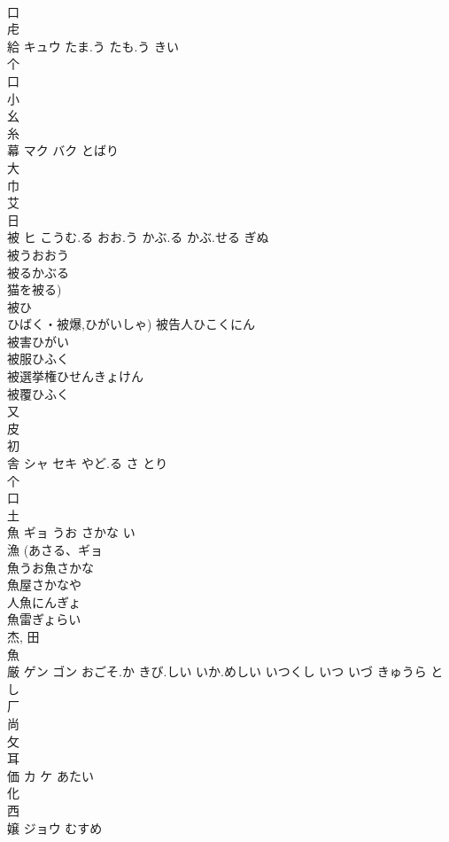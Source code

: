 \documentclass[8pt]{extreport}
\begin{document}
\begin{CJK}{UTF8}{min}
\\	口 
\\	虍 
\\	給	キュウ	たま.う たも.う きい	
\\	个 
\\	口 
\\	小 
\\	幺 
\\	糸 
\\	幕	マク バク	とばり	
\\	大 
\\	巾 
\\	艾 
\\	日 
\\	被	ヒ	こうむ.る おお.う かぶ.る かぶ.せる ぎぬ	
\\	被うおおう
\\	被るかぶる
\\	猫を被る)
\\	被ひ
\\	ひばく・被爆,ひがいしゃ) 被告人ひこくにん
\\	被害ひがい
\\	被服ひふく
\\	被選挙権ひせんきょけん
\\	被覆ひふく
\\	又 
\\	皮 
\\	初 
\\	舎	シャ セキ	やど.る さ とり	
\\	个 
\\	口 
\\	土 
\\	魚	ギョ	うお さかな い	
\\	漁 (あさる、ギョ 
\\	魚うお魚さかな
\\	魚屋さかなや
\\	人魚にんぎょ
\\	魚雷ぎょらい
\\	杰, 田 
\\	魚 
\\	厳	ゲン ゴン	おごそ.か きび.しい いか.めしい いつくし いつ いづ きゅうら とし	
\\	厂 
\\	尚 
\\	攵 
\\	耳 
\\	価	カ ケ	あたい	
\\	化 
\\	西 
\\	嬢	ジョウ	むすめ	

\end{CJK}
\end{document}
